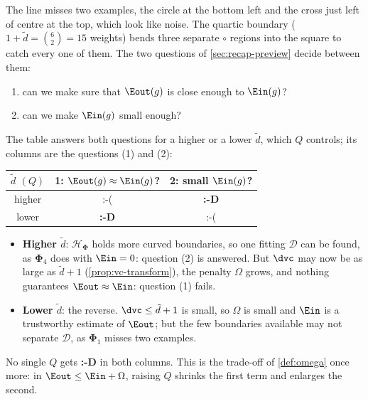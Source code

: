 The line misses two examples, the circle at the bottom left and the cross
just left of centre at the top, which look like noise. The quartic boundary
(\(1 + \tilde{d} = \binom{6}{2} = 15\) weights) bends three separate
\(\circ\) regions into the square to catch every one of them. The two questions
of \autoref{sec:recap-preview} decide between them:
\begin{enumerate}[(1)]
    \item can we make sure that \(\Eout(g)\) is close enough to \(\Ein(g)\)?
    \item can we make \(\Ein(g)\) small enough?
\end{enumerate}

The table answers both questions for a higher or a lower \(\tilde{d}\), which
\(Q\) controls; its columns are the questions (1) and (2):

\begin{center}
    \solidrules
    \begin{tabular}{@{}c|cc@{}}
        \toprule
        \(\tilde{d}\) \((Q)\) & 1: \(\Eout(g) \approx \Ein(g)\)?
        & 2: small \(\Ein(g)\)?\\
        \midrule
        higher & :-( & \textbf{:-D}\\
        lower & \textbf{:-D} & :-(\\
        \bottomrule
    \end{tabular}
\end{center}

\begin{itemize}
    \item \textbf{Higher \(\tilde{d}\)}: \(\mathcal{H}_{\bm{\Phi}}\) holds
        more curved boundaries, so one fitting \(\mathcal{D}\) can be found,
        as \(\bm{\Phi}_4\) does with \(\Ein = 0\): question (2) is answered.
        But \(\dvc\) may now be as large as \(\tilde{d} + 1\)
        (\autoref{prop:vc-transform}), the penalty \(\Omega\) grows, and
        nothing guarantees \(\Eout \approx \Ein\): question (1) fails.
    \item \textbf{Lower \(\tilde{d}\)}: the reverse. \(\dvc \le \tilde{d} +
        1\) is small, so \(\Omega\) is small and \(\Ein\) is a trustworthy
        estimate of \(\Eout\); but the few boundaries available may not
        separate \(\mathcal{D}\), as \(\bm{\Phi}_1\) misses two examples.
\end{itemize}

No single \(Q\) gets \textbf{:-D} in both columns. This is the trade-off of
\autoref{def:omega} once more: in \(\Eout \le \Ein + \Omega\), raising \(Q\)
shrinks the first term and enlarges the second.

